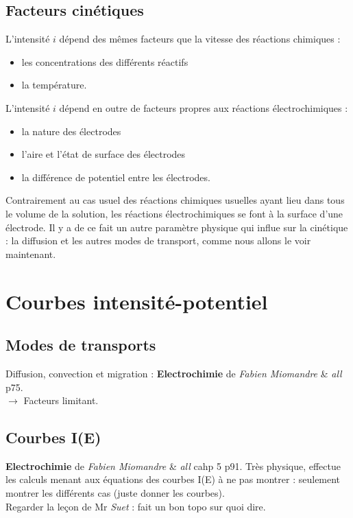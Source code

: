 \documentclass[12pt,prb,aps,epsf]{article}
\begin{document}
\subsection{Facteurs cinétiques}
L'intensité $i$ dépend des mêmes facteurs que la vitesse des réactions chimiques :
\begin{itemize}
	\item les concentrations des différents réactifs
	\item la température.
\end{itemize}
L'intensité $i$ dépend en outre de facteurs propres aux réactions électrochimiques :
\begin{itemize}
	\item la nature des électrodes
	\item l'aire et l'état de surface des électrodes
	\item la différence de potentiel entre les électrodes.
\end{itemize}

Contrairement au cas usuel des réactions chimiques usuelles ayant lieu dans tous le volume de la solution, les réactions électrochimiques se font à la surface d'une électrode. Il y a de ce fait un autre paramètre physique qui influe sur la cinétique : la diffusion et les autres modes de transport, comme nous allons le voir maintenant.
 
\section{Courbes intensité-potentiel}
\subsection{Modes de transports}
Diffusion, convection et migration : \textbf{Electrochimie} de \textit{Fabien Miomandre} \& \textit{all} p75.\\
$\longrightarrow$ Facteurs limitant. 

\subsection{Courbes I(E)}
\textbf{Electrochimie} de \textit{Fabien Miomandre} \& \textit{all} cahp 5 p91. Très physique, effectue les calculs menant aux équations des courbes I(E) à ne pas montrer : seulement montrer les différents cas (juste donner les courbes).\\
Regarder la leçon de Mr \textit{Suet} : fait un bon topo sur quoi dire.
\end{document}
